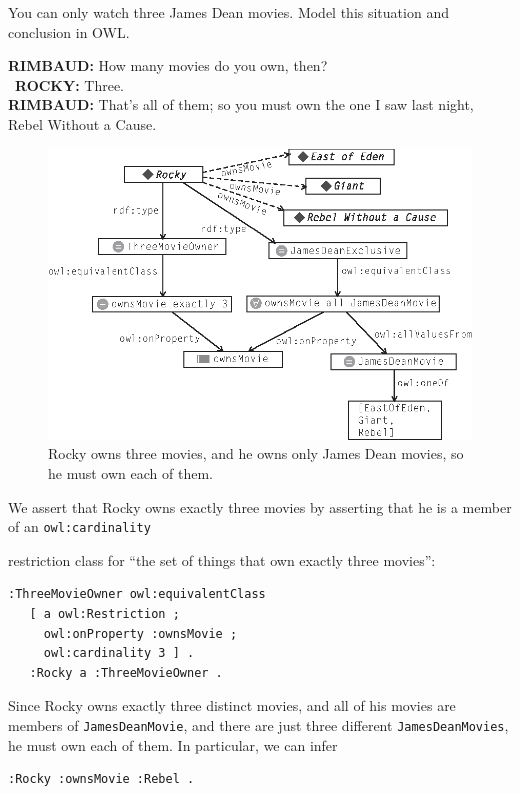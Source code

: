 \begin{challenge}{You can only watch three James Dean movies. } 
\label{chal:34}
Model this situation and conclusion in OWL.

\textbf{RIMBAUD:} How many movies do you own, then?  \\\
\textbf{ROCKY:} Three. \\
\textbf{RIMBAUD:} That's all of them; so you must own the one I saw last night, Rebel Without a Cause.

\begin{figure}
\centering
\includegraphics[width=5in]{media/ch13/f13-04.eps}
\caption{Rocky owns three movies, and he owns only James Dean movies, so he must
own each of them.}
\label{fig:ch13.04}
\end{figure}


\solution

We assert that Rocky owns exactly three movies by asserting that he is a
member of an \texttt{owl:cardinality}

restriction class for ``the set of things that own exactly three movies'':

\begin{lstlisting}
:ThreeMovieOwner owl:equivalentClass
   [ a owl:Restriction ;
     owl:onProperty :ownsMovie ;
     owl:cardinality 3 ] .
   :Rocky a :ThreeMovieOwner .
\end{lstlisting}

Since Rocky owns exactly three distinct movies, and all of his movies
are members of \texttt{JamesDeanMovie}, and there are just three different
\texttt{JamesDeanMovies}, he must own each of them. In particular, we can infer

\begin{lstlisting}
:Rocky :ownsMovie :Rebel .
\end{lstlisting}
\end{challenge}


